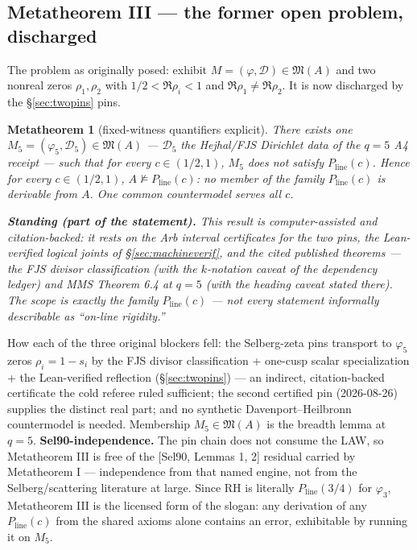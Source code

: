 \documentclass[11pt]{amsart}
\newtheorem{metatheorem}[theorem]{Metatheorem}
\theoremstyle{remark}
\begin{document}
\subsection{Metatheorem III --- the former open problem, discharged}
\label{sec:metaIII}

The problem as originally posed: exhibit
$M=(\varphi,\mathcal D)\in\mathfrak M(A)$ and two nonreal zeros
$\rho_1,\rho_2$ with $1/2<\Re\rho_i<1$ and $\Re\rho_1\neq\Re\rho_2$. It is
now discharged by the \S\ref{sec:twopins} pins.

\begin{metatheorem}[fixed-witness quantifiers explicit]
\label{met:III}
There exists one $M_5=(\varphi_5,\mathcal D_5)\in\mathfrak M(A)$ ---
$\mathcal D_5$ the Hejhal/FJS Dirichlet data of the $q=5$ A4 receipt ---
such that for every $c\in(1/2,1)$, $M_5$ does not satisfy
$P_{\mathrm{line}}(c)$. Hence for every $c\in(1/2,1)$,
$A\nvDash P_{\mathrm{line}}(c)$: no member of the family
$P_{\mathrm{line}}(c)$ is derivable from $A$. One common countermodel
serves all $c$.

\textbf{Standing (part of the statement).} This result is
computer-assisted and citation-backed: it rests on the Arb interval
certificates for the two pins, the Lean-verified logical joints of
\S\ref{sec:machineverif}, and the cited published theorems --- the FJS
divisor classification (with the $k$-notation caveat of the dependency
ledger) and MMS Theorem 6.4 at $q=5$ (with the heading caveat stated
there). The scope is exactly the family $P_{\mathrm{line}}(c)$
--- not every statement informally describable as ``on-line rigidity.''
\end{metatheorem}

How each of the three original blockers fell: the Selberg-zeta pins
transport to $\varphi_5$ zeros $\rho_i=1-s_i$ by the FJS divisor
classification + one-cusp scalar specialization + the Lean-verified
reflection (\S\ref{sec:twopins}) --- an indirect, citation-backed
certificate the cold referee ruled sufficient; the second certified pin
(2026-08-26) supplies the distinct real part; and no synthetic
Davenport--Heilbronn countermodel is needed. Membership
$M_5\in\mathfrak M(A)$ is the breadth lemma at $q=5$.
\textbf{Sel90-independence.} The pin chain does not consume the LAW, so
Metatheorem III is free of the [Sel90, Lemmas 1, 2] residual carried by
Metatheorem I --- independence from that named engine, not from the
Selberg/scattering literature at large. Since RH is literally
$P_{\mathrm{line}}(3/4)$ for $\varphi_3$, Metatheorem III is the licensed
form of the slogan: any derivation of any $P_{\mathrm{line}}(c)$ from the
shared axioms alone contains an error, exhibitable by running it on
$M_5$.
\end{document}
